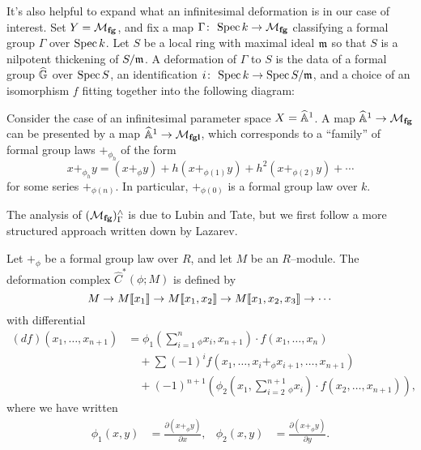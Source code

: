 \begin{example}
It's also helpful to expand what an infinitesimal deformation is in our case of interest.  Set $Y = \mathcal{M}_{\mathbf{fg}}$, and fix a map $\Gamma\colon\thinspace \operatorname{Spec} k \to \mathcal{M}_{\mathbf{fg}}$ classifying a formal group $\Gamma$ over $\operatorname{Spec} k$.  Let $S$ be a local ring with maximal ideal $\mathfrak m$ so that $S$ is a nilpotent thickening of $S / \mathfrak m$.  A deformation of $\Gamma$ to $S$ is the data of a formal group $\widehat{\mathbb G}$ over $\operatorname{Spec} S$, an identification $i\colon\thinspace \operatorname{Spec} k \to \operatorname{Spec} S/\mathfrak m$, and a choice of an isomorphism $f$ fitting together into the following diagram:
\begin{center}
\end{center}
\end{example}

\begin{example}
Consider the case of an infinitesimal parameter space $X = \widehat{\mathbb{A}}^1$.  A map $\widehat{\mathbb{A}}^1 \to \mathcal{M}_{\mathbf{fg}}$ can be presented by a map $\widehat{\mathbb{A}}^1 \to \mathcal{M}_{\mathbf{fgl}}$, which corresponds to a ``family'' of formal group laws $+_{\phi_h}$ of the form \[x +_{\phi_h} y = (x +_\phi y) + h(x +_{\phi(1)} y) + h^2(x +_{\phi(2)} y) + \cdots\] for some series $+_{\phi(n)}$.  In particular, $+_{\phi(0)}$ is a formal group law over $k$.
\end{example}

The analysis of $(\mathcal{M}_{\mathbf{fg}})^\wedge_\Gamma$ is due to Lubin and Tate, but we first follow a more structured approach written down by Lazarev.
\begin{definition}
Let $+_\phi$ be a formal group law over $R$, and let $M$ be an $R$--module. The deformation complex $\widehat C^*(\phi; M)$ is defined by \[M \to M\llbracket{x_1}\rrbracket \to M\llbracket{x_1, x_2}\rrbracket \to M\llbracket{x_1, x_2, x_3}\rrbracket \to \cdots\] with differential
\begin{align*}
(df)(x_1, \ldots, x_{n+1}) & = \phi_1\left(\sum_{i=1}^n {}_\phi x_i, x_{n+1} \right) \cdot f(x_1, \ldots, x_n) \\
& \quad + \sum (-1)^i f(x_1, \ldots, x_i +_\phi x_{i+1}, \ldots, x_{n+1}) \\
& \quad + (-1)^{n+1} \left( \phi_2\left(x_1, \sum_{i=2}^{n+1} {}_\phi x_i \right) \cdot f(x_2, \ldots, x_{n+1}) \right),
\end{align*}
where we have written
\begin{align*}
\phi_1(x, y) & = \frac{\partial(x +_\phi y)}{\partial x}, &
\phi_2(x, y) & = \frac{\partial(x +_\phi y)}{\partial y}.
\end{align*}
\end{definition}

